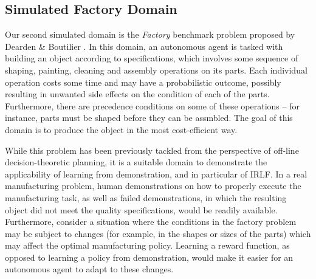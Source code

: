 \documentclass{aamas2016}
\newcommand{\jm}[1]{\textcolor{blue}{Joao: #1}}
\newcommand{\jm}[1]{}
\begin{document}


\subsection{Simulated Factory Domain}
Our second simulated domain is the \emph{Factory} benchmark problem proposed by Dearden \& Boutilier \cite{dearden1997abstraction}. In this domain, an autonomous agent is tasked with building an object according to specifications, which involves some sequence of shaping, painting, cleaning and assembly operations on its parts. Each individual operation costs some time and may have a probabilistic outcome, possibly resulting in unwanted side effects on the condition of each of the parts. Furthermore, there are precedence conditions on some of these operations -- for instance, parts must be shaped before they can be assmbled. The goal of this domain is to produce the object in the most cost-efficient way.

While this problem has been previously tackled from the perspective of off-line decision-theoretic planning, it is a suitable domain to demonstrate the applicability of learning from demonstration, and in particular of IRLF. In a real manufacturing problem, human demonstrations on how to properly execute the manufacturing task, as well as failed demonstrations, in which the resulting object did not meet the quality specifications, would be readily available. Furthermore, consider a situation where the conditions in the factory problem may be subject to changes (for example, in the shapes or sizes of the parts) which may affect the optimal manufacturing policy. Learning a reward function, as opposed to learning a policy from demonstration, would make it easier for an autonomous agent to adapt to these changes.
\end{document}
